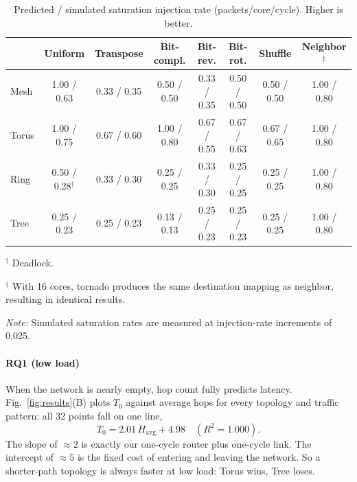\documentclass[conference]{IEEEtran}
\begin{document}
\begin{table}[!t]
  \caption{Predicted / simulated saturation injection rate
  (packets/core/cycle). Higher is better.}
  \label{tab:sat}
  \centering
  \footnotesize
  \setlength{\tabcolsep}{5pt}
  \begin{tabular}{lccccccc}
    \hline
    & \textbf{Uniform} & \textbf{Transpose} & \textbf{Bit-compl.}
    & \textbf{Bit-rev.} & \textbf{Bit-rot.} & \textbf{Shuffle}
    & \textbf{Neighbor}$^{\ddagger}$ \\
    \hline
    Mesh  & 1.00 / 0.63 & 0.33 / 0.35 & 0.50 / 0.50 & 0.33 / 0.35 & 0.50 / 0.50 & 0.50 / 0.50 & 1.00 / 0.80 \\
    Torus & 1.00 / 0.75 & 0.67 / 0.60 & 1.00 / 0.80 & 0.67 / 0.55 & 0.67 / 0.63 & 0.67 / 0.65 & 1.00 / 0.80 \\
    Ring  & 0.50 / 0.28$^{\dagger}$ & 0.33 / 0.30 & 0.25 / 0.25 & 0.33 / 0.30 & 0.25 / 0.25 & 0.25 / 0.25 & 1.00 / 0.80 \\
    Tree  & 0.25 / 0.23 & 0.25 / 0.23 & 0.13 / 0.13 & 0.25 / 0.23 & 0.25 / 0.23 & 0.25 / 0.25 & 1.00 / 0.80 \\
    \hline
  \end{tabular}

  \vspace{2pt}
  \parbox{0.82\textwidth}
{\footnotesize
\noindent $^{\dagger}$ Deadlock.\par
\noindent $^{\ddagger}$ With 16 cores, tornado produces the same
destination mapping as neighbor, resulting in identical results.\par
\noindent \textit{Note:} Simulated saturation rates are measured
at injection-rate increments of 0.025.\par
}
\end{table}

\paragraph{RQ1 (low load)}
When the network is nearly empty, hop count fully predicts latency.
Fig.~\ref{fig:results}(B) plots $T_0$ against average hops for every
topology and traffic pattern: all 32 points fall on one line,
\begin{equation*}
  T_0 = 2.01\,H_{\mathrm{avg}} + 4.98
  \quad (R^2 = 1.000).
\end{equation*}
The slope of $\approx 2$ is exactly our one-cycle router plus
one-cycle link. The intercept of $\approx 5$ is the fixed cost of
entering and leaving the network. So a shorter-path topology is always
faster at low load: Torus wins, Tree loses.
\end{document}
